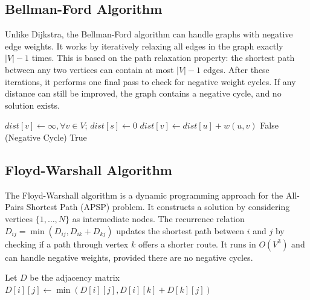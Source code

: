 \documentclass[12pt, a4paper]{article}
\begin{document}
\subsection{Bellman-Ford Algorithm}
Unlike Dijkstra, the Bellman-Ford algorithm can handle graphs with negative edge weights. It works by iteratively relaxing all edges in the graph exactly $|V|-1$ times. This is based on the path relaxation property: the shortest path between any two vertices can contain at most $|V|-1$ edges. After these iterations, it performs one final pass to check for negative weight cycles. If any distance can still be improved, the graph contains a negative cycle, and no solution exists.

\begin{algorithm}[H]
\caption{Bellman-Ford(G, s)}
\begin{algorithmic}[1]
\State $dist[v] \gets \infty, \forall v \in V$; $dist[s] \gets 0$
            \State $dist[v] \gets dist[u] + w(u,v)$
        \EndIf
    \EndFor
\EndFor
{}
     \Return False (Negative Cycle) \EndIf
\EndFor
\State \Return True
\end{algorithmic}
\end{algorithm}

\clearpage

\subsection{Floyd-Warshall Algorithm}
The Floyd-Warshall algorithm is a dynamic programming approach for the All-Pairs Shortest Path (APSP) problem. It constructs a solution by considering vertices $\{1, \dots, N\}$ as intermediate nodes. The recurrence relation $D_{ij} = \min(D_{ij}, D_{ik} + D_{kj})$ updates the shortest path between $i$ and $j$ by checking if a path through vertex $k$ offers a shorter route. It runs in $O(V^3)$ and can handle negative weights, provided there are no negative cycles.

\begin{algorithm}[H]
\caption{Floyd-Warshall(G)}
\begin{algorithmic}[1]
\State Let $D$ be the adjacency matrix
            \State $D[i][j] \gets \min(D[i][j], D[i][k] + D[k][j])$
        \EndFor
    \EndFor
\EndFor
\end{algorithmic}
\end{algorithm}
\end{document}
